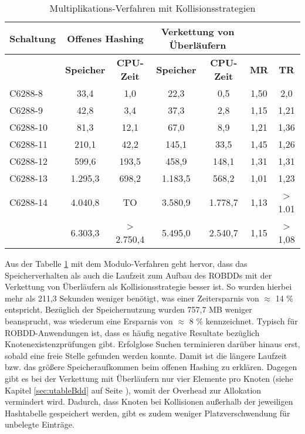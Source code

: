 \newpage
\begin{table}[bth]
	\footnotesize
	\centering
	\caption{Multiplikations-Verfahren mit Kollisionsstrategien}
	\label{tab:ovh2}
	\begin{tabular}{ | l | c | c | c | c | c | c |}
		\hline
		\multicolumn{1}{|c|}{\textbf{Schaltung}} & \multicolumn{2}{c|}{\textbf{Offenes Hashing}} & \multicolumn{2}{c|}{\textbf{Verkettung von Überläufern}} & \multicolumn{2}{c|}{~} \\ \hline
		~ & \multicolumn{1}{c|}{\textbf{Speicher}} & \multicolumn{1}{c|}{\textbf{CPU-Zeit}} & \multicolumn{1}{c|}{\textbf{Speicher}} & \multicolumn{1}{c|}{\textbf{CPU-Zeit}} & \multicolumn{1}{c|}{\textbf{MR}} & \multicolumn{1}{c|}{\textbf{TR}}\\ \hline
		C6288-8 & 33,4 & 1,0 & 22,3 & 0,5 & 1,50 & 2,0  \\ \hline
		C6288-9 & 42,8 & 3,4 & 37,3 & 2,8 & 1,15 & 1,21  \\ \hline
		C6288-10 & 81,3 & 12,1 & 67,0 & 8,9 & 1,21 & 1,36  \\ \hline
		C6288-11 & 210,1 & 42,2 & 145,1 & 33,5 & 1,45 & 1,26  \\ \hline
		C6288-12 & 599,6 & 193,5 & 458,9 & 148,1 & 1,31 & 1,31  \\ \hline
		C6288-13 & 1.295,3 & 698,2 & 1.183,5 & 568,2 & 1,01 & 1,23 \\ \hline
		C6288-14 & 4.040,8 & TO & 3.580,9 & 1.778,7 & 1,13 & > 1.01 \\ \hlineB{3}
		\multicolumn{1}{|c|}{\textbf{Gesamt}} & 6.303,3 & > 2.750,4 & 5.495,0 & 2.540,7 & 1,15 & > 1,08 \\ \hline
	\end{tabular}
\end{table}
Aus der Tabelle \ref{tab:ovh2} mit dem Modulo-Verfahren geht hervor, dass das Speicherverhalten als auch die Laufzeit zum Aufbau des ROBDDs mit der Verkettung von Überläufern als Kollisionsstrategie besser ist. So wurden hierbei mehr als 211,3 Sekunden weniger benötigt, was einer Zeitersparnis von $\approx$ 14 \% entspricht. Bezüglich der Speichernutzung wurden 757,7 MB weniger beansprucht, was wiederum eine Ersparnis von $\approx$ 8 \% kennzeichnet. Typisch für ROBDD-Anwendungen ist, dass es häufig negative Resultate bezüglich Knotenexistenzprüfungen gibt. Erfolglose Suchen terminieren darüber hinaus erst, sobald eine freie Stelle gefunden werden konnte. Damit ist die längere Laufzeit bzw. das größere Speicheraufkommen beim offenen Hashing zu erklären. Dagegen gibt es bei der Verkettung mit Überläufern nur vier Elemente pro Knoten (siehe Kapitel \ref{sec:utableBdd} auf Seite \pageref{sec:utableBdd}), womit der Overhead zur Allokation vermindert wird. Dadurch, dass Knoten bei Kollisionen außerhalb der jeweiligen Hashtabelle gespeichert werden, gibt es zudem weniger Platzverschwendung für unbelegte Einträge.\\
